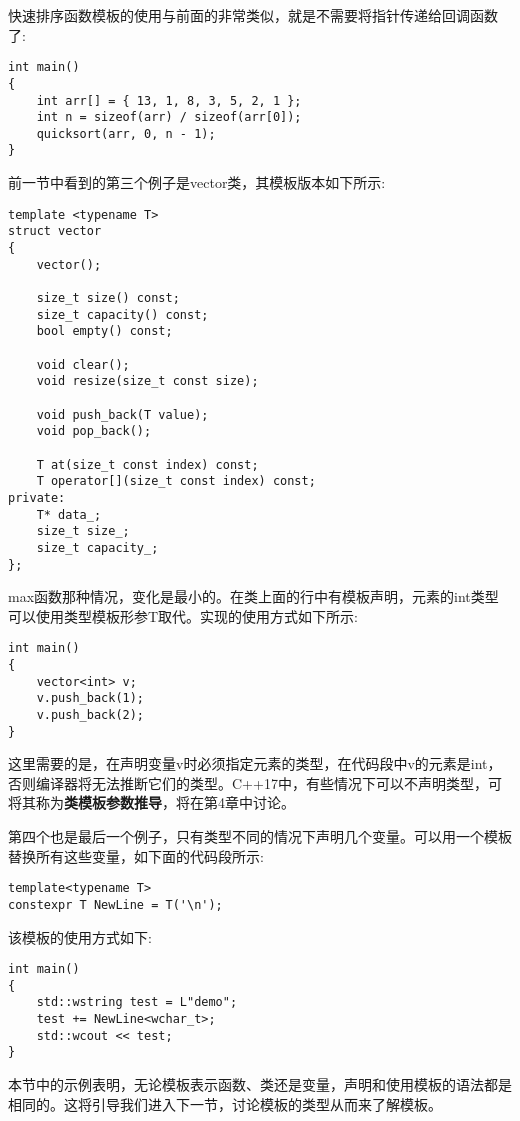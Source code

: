 快速排序函数模板的使用与前面的非常类似，就是不需要将指针传递给回调函数了:

\begin{lstlisting}[style=styleCXX]
int main()
{
	int arr[] = { 13, 1, 8, 3, 5, 2, 1 };
	int n = sizeof(arr) / sizeof(arr[0]);
	quicksort(arr, 0, n - 1);
}
\end{lstlisting}

前一节中看到的第三个例子是vector类，其模板版本如下所示:

\begin{lstlisting}[style=styleCXX]
template <typename T>
struct vector
{
	vector();
	
	size_t size() const;
	size_t capacity() const;
	bool empty() const;
	
	void clear();
	void resize(size_t const size);
	
	void push_back(T value);
	void pop_back();
	
	T at(size_t const index) const;
	T operator[](size_t const index) const;
private:
	T* data_;
	size_t size_;
	size_t capacity_;
};
\end{lstlisting}

max函数那种情况，变化是最小的。在类上面的行中有模板声明，元素的int类型可以使用类型模板形参T取代。实现的使用方式如下所示:

\begin{lstlisting}[style=styleCXX]
int main()
{
	vector<int> v;
	v.push_back(1);
	v.push_back(2);
}
\end{lstlisting}

这里需要的是，在声明变量v时必须指定元素的类型，在代码段中v的元素是int，否则编译器将无法推断它们的类型。C++17中，有些情况下可以不声明类型，可将其称为\textbf{类模板参数推导}，将在第4章中讨论。

第四个也是最后一个例子，只有类型不同的情况下声明几个变量。可以用一个模板替换所有这些变量，如下面的代码段所示:

\begin{lstlisting}[style=styleCXX]
template<typename T>
constexpr T NewLine = T('\n');
\end{lstlisting}

该模板的使用方式如下:

\begin{lstlisting}[style=styleCXX]
int main()
{
	std::wstring test = L"demo";
	test += NewLine<wchar_t>;
	std::wcout << test;
}
\end{lstlisting}

本节中的示例表明，无论模板表示函数、类还是变量，声明和使用模板的语法都是相同的。这将引导我们进入下一节，讨论模板的类型从而来了解模板。














